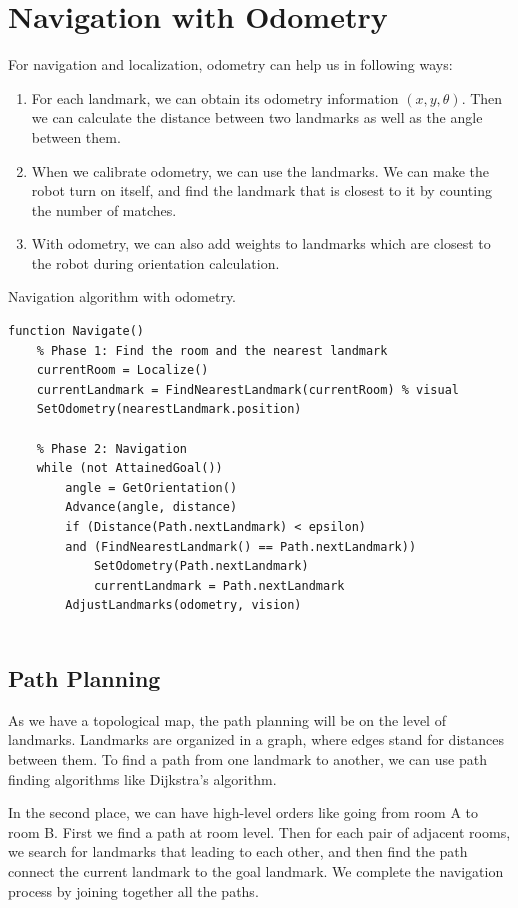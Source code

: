 \documentclass[a4paper]{scrartcl}
\begin{document}
\newpage
\section{Navigation with Odometry}
For navigation and localization, odometry can help us in following ways:
\begin{enumerate}
\item For each landmark, we can obtain its odometry information $(x, y, \theta)$. Then we can calculate the distance between two landmarks as well as the angle between them.
\item When we calibrate odometry, we can use the landmarks. We can make the robot turn on itself, and find the landmark that is closest to it by counting the number of matches.  
\item With odometry, we can also add weights to landmarks which are closest to the robot during orientation calculation. 
\end{enumerate}

\begin{listing}[H]
\caption{Navigation algorithm with odometry.}
\begin{verbatim}
function Navigate()
	% Phase 1: Find the room and the nearest landmark
    currentRoom = Localize()
   	currentLandmark = FindNearestLandmark(currentRoom) % visual
    SetOdometry(nearestLandmark.position)
    
    % Phase 2: Navigation
    while (not AttainedGoal())
    	angle = GetOrientation()
    	Advance(angle, distance)
        if (Distance(Path.nextLandmark) < epsilon) 
        and (FindNearestLandmark() == Path.nextLandmark))
        	SetOdometry(Path.nextLandmark)
            currentLandmark = Path.nextLandmark
        AdjustLandmarks(odometry, vision)
    
\end{verbatim}
\end{listing}

\subsection{Path Planning}
As we have a topological map, the path planning will be on the level of landmarks. Landmarks are organized in a graph, where edges stand for distances between them. 
To find a path from one landmark to another, we can use path finding algorithms like Dijkstra's algorithm. 

In the second place, we can have high-level orders like going from room A to room B. First we find a path at room level. Then for each pair of adjacent rooms, we search for landmarks that leading to each other, and then find the path connect the current landmark to the goal landmark. We complete the navigation process by joining together all the paths.
\end{document}
